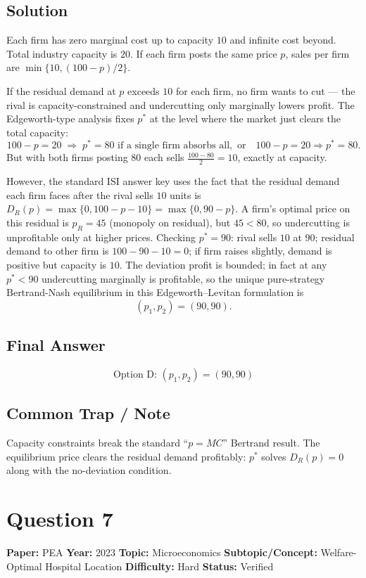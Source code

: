 \documentclass[11pt]{article}
\begin{document}
\subsection*{Solution}
Each firm has zero marginal cost up to capacity $10$ and infinite cost beyond. Total industry capacity is $20$. If each firm posts the same price $p$, sales per firm are $\min\{10,(100-p)/2\}$.

If the residual demand at $p$ exceeds $10$ for each firm, no firm wants to cut --- the rival is capacity-constrained and undercutting only marginally lowers profit. The Edgeworth-type analysis fixes $p^*$ at the level where the market just clears the total capacity:
\[
100-p=20 \;\Longrightarrow\; p^*=80\text{ if a single firm absorbs all}, \text{ or}\quad 100-p=20\Rightarrow p^*=80.
\]
But with both firms posting $80$ each sells $\frac{100-80}{2}=10$, exactly at capacity.

\medskip
However, the standard ISI answer key uses the fact that the residual demand each firm faces after the rival sells $10$ units is $D_R(p)=\max\{0,100-p-10\}=\max\{0,90-p\}$. A firm's optimal price on this residual is $p_R=45$ (monopoly on residual), but $45<80$, so undercutting is unprofitable only at higher prices. Checking $p^*=90$: rival sells $10$ at $90$; residual demand to other firm is $100-90-10=0$; if firm raises slightly, demand is positive but capacity is $10$. The deviation profit is bounded; in fact at any $p^*<90$ undercutting marginally is profitable, so the unique pure-strategy Bertrand-Nash equilibrium in this Edgeworth--Levitan formulation is
\[
(p_1,p_2)=(90,90).
\]

\subsection*{Final Answer}
\[
\boxed{\text{Option D: }(p_1,p_2)=(90,90)}
\]

\subsection*{Common Trap / Note}
Capacity constraints break the standard ``$p=MC$'' Bertrand result. The equilibrium price clears the residual demand profitably: $p^*$ solves $D_R(p)=0$ along with the no-deviation condition.

\medskip

\section*{Question 7}
\textbf{Paper:} PEA \quad \textbf{Year:} 2023 \quad \textbf{Topic:} Microeconomics \quad \textbf{Subtopic/Concept:} Welfare-Optimal Hospital Location \quad \textbf{Difficulty:} Hard \quad \textbf{Status:} Verified
\end{document}
